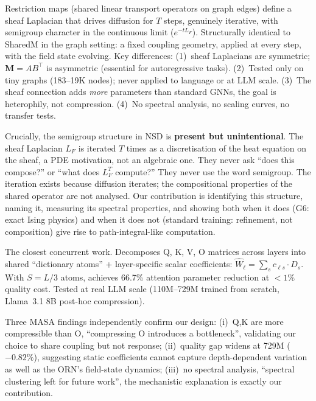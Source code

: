 \documentclass[11pt, a4paper]{article}
\newcommand{\M}{\mathbf{M}}
\theoremstyle{remark}
\begin{document}
\begin{description}[nosep, leftmargin=1.5em]
    \item[Neural Sheaf Diffusion~\cite{bodnar2022sheaf}:]
    Restriction maps (shared linear transport operators on graph edges) define a sheaf Laplacian that drives diffusion for $T$ steps, genuinely iterative, with semigroup character in the continuous limit ($e^{-tL_F}$).
    Structurally identical to SharedM in the graph setting: a fixed coupling geometry, applied at every step, with the field state evolving.
    Key differences: (1)~sheaf Laplacians are symmetric; $\M = AB^\top$ is asymmetric (essential for autoregressive tasks). (2)~Tested only on tiny graphs (183--19K nodes); never applied to language or at LLM scale. (3)~The sheaf connection adds \emph{more} parameters than standard GNNs, the goal is heterophily, not compression. (4)~No spectral analysis, no scaling curves, no transfer tests.

    Crucially, the semigroup structure in NSD is \textbf{present but unintentional}.
    The sheaf Laplacian $L_F$ is iterated $T$ times as a discretisation of the heat equation on the sheaf, a PDE motivation, not an algebraic one.
    They never ask ``does this compose?'' or ``what does $L_F^T$ compute?''
    They never use the word semigroup.
    The iteration exists because diffusion iterates; the compositional properties of the shared operator are not analysed.
    Our contribution is identifying this structure, naming it, measuring its spectral properties, and showing both when it does (G6: exact Ising physics) and when it does not (standard training: refinement, not composition) give rise to path-integral-like computation.

    \item[MASA~\cite{masa2025} (2025):]
    The closest concurrent work. Decomposes Q, K, V, O matrices across layers into shared ``dictionary atoms'' + layer-specific scalar coefficients: $\hat{W}_\ell = \sum_s c_{\ell s} \cdot D_s$.
    With $S = L/3$ atoms, achieves 66.7\% attention parameter reduction at $<1\%$ quality cost.
    Tested at real LLM scale (110M--729M trained from scratch, Llama~3.1 8B post-hoc compression).

    Three MASA findings independently confirm our design:
    (i)~Q,K are more compressible than O, ``compressing O introduces a bottleneck'', validating our choice to share coupling but not response;
    (ii)~quality gap widens at 729M ($-0.82\%$), suggesting static coefficients cannot capture depth-dependent variation as well as the ORN's field-state dynamics;
    (iii)~no spectral analysis, ``spectral clustering left for future work'', the mechanistic explanation is exactly our contribution.


\end{description}
\end{document}
